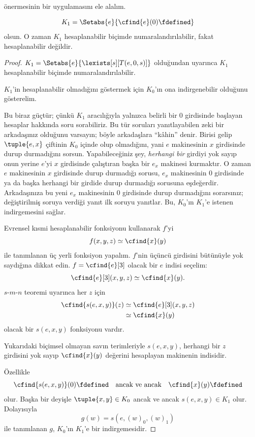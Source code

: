 \documentclass[../../../include/open-logic-section]{subfiles}
\begin{document}

 önermesinin bir uygulamasını ele alalım.

\begin{prop}
\[
  K_1=\Setabs{e}{\cfind{e}(0)\fdefined}
\]
olsun. O zaman $K_1$ hesaplanabilir biçimde numaralandırılabilir, fakat
hesaplanabilir değildir.
\end{prop}

\begin{proof}
$K_1=\Setabs{e}{\lexists[s][T(e,0,s)]}$ olduğundan
 uyarınca $K_1$ hesaplanabilir biçimde
numaralandırılabilir.

$K_1$'in hesaplanabilir olmadığını göstermek için $K_0$'ın ona
indirgenebilir olduğunu gösterelim.

\begin{explain}
Bu biraz güçtür; çünkü $K_1$ aracılığıyla yalnızca belirli bir $0$ girdisinde
başlayan hesaplar hakkında soru sorabiliriz. Bu tür soruları yanıtlayabilen
zeki bir arkadaşınız olduğunu varsayın; böyle arkadaşlara ``kâhin'' denir.
Birisi gelip $\tuple{e,x}$ çiftinin $K_0$ içinde olup olmadığını, yani
$e$ makinesinin $x$ girdisinde durup durmadığını sorsun. Yapabileceğiniz şey,
\emph{herhangi bir} girdiyi yok sayıp onun yerine $e$'yi $x$ girdisinde
çalıştıran başka bir $e_x$ makinesi kurmaktır. O zaman $e$ makinesinin $x$
girdisinde durup durmadığı sorusu, $e_x$ makinesinin $0$ girdisinde ya da
başka herhangi bir girdide durup durmadığı sorusuna eşdeğerdir. Arkadaşınıza
bu yeni $e_x$ makinesinin $0$ girdisinde durup durmadığını sorarsınız;
değiştirilmiş soruya verdiği yanıt ilk soruyu yanıtlar. Bu, $K_0$'ın $K_1$'e
istenen indirgemesini sağlar.
\end{explain}

Evrensel kısmi hesaplanabilir fonksiyonu kullanarak $f$'yi
\[
  f(x,y,z)\simeq\cfind{x}(y)
\]
ile tanımlanan üç yerli fonksiyon yapalım. $f$'nin üçüncü girdisini bütünüyle
yok saydığına dikkat edin. $f=\cfind{e}[3]$ olacak bir $e$ indisi seçelim:
\[
  \cfind{e}[3](x,y,z)\simeq\cfind{x}(y).
\]
$s$-$m$-$n$ teoremi uyarınca her $z$ için
\begin{align*}
  \cfind{s(e,x,y)}(z) & \simeq\cfind{e}[3](x,y,z)\\
  & \simeq\cfind{x}(y)
\end{align*}
olacak bir $s(e,x,y)$ fonksiyonu vardır.

\begin{explain}
Yukarıdaki biçimsel olmayan savın terimleriyle $s(e,x,y)$, herhangi bir
$z$ girdisini yok sayıp $\cfind{x}(y)$ değerini hesaplayan makinenin indisidir.
\end{explain}

Özellikle
\[
  \cfind{s(e,x,y)}(0)\fdefined\quad\text{ancak ve ancak}\quad
  \cfind{x}(y)\fdefined
\]
olur. Başka bir deyişle $\tuple{x,y}\in K_0$ ancak ve ancak
$s(e,x,y)\in K_1$ olur. Dolayısıyla
\[
  g(w)=s(e,(w)_0,(w)_1)
\]
ile tanımlanan $g$, $K_0$'ın $K_1$'e bir indirgemesidir.
\end{proof}
\end{document}
